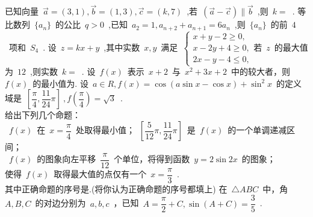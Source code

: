 \documentclass[printbox]{BHCexam}
\begin{document}
\begin{questions}
\clearpage
\begin{figure*}[!htb] 
\begin{minipage}[t]{0.5\textwidth}%
\vspace{-1cm}
\centering  
\end{minipage}  
\begin{minipage}[t]{0.5\textwidth}  
\vspace{0cm}
\centering  
\end{minipage}  
\end{figure*}
\vspace{-2cm}
\tiankong
\question 已知向量~$\vec{a}=(3,1),\vec{b}=(1,3),\vec{c}=(k,7)$~,若~$(\vec{a}-\vec{c}) \parallel \vec{b}$~,则~$k=$~\mtk{}.
\question 等比数列~$\{a_n \}$~的公比~$q>0$~,已知~$a_2=1,a_{n+2}+a_{n+1}=6a_n$~,则~$\{a_n \}$~的前~$4$~项和~$S_4$~\mtk{}.
\question 设~$z=kx+y$~,其中实数~$x,y$~满足~$ \begin{cases}
x+y-2\geq 0,\\
x-2y+4\geq 0, \\
2x-y-4\leq 0,
\end{cases}$若~$z$~的最大值为~$12$~,则实数~$k=$~\mtk{}.
\question 设~$f(x)$~表示~$x+2$~与~$x^2+3x+2$~中的较大者，则~$f(x)$~的最小值为\mtk{}.
\question 设~$a\in R,f(x)=\cos (a\sin x-\cos x)+\sin ^2 x$~的定义域是~$\left[ \dfrac{\pi}{4},\dfrac{11}{24} \pi \right]~,f(\dfrac{\pi}{4})=\sqrt{3}$~.\\给出下列几个命题：\\
~$f(x)$~在~$x=\dfrac{\pi}{4}$~处取得最小值；~$\left[ \dfrac{5}{12} \pi,\dfrac{11}{24} \pi \right]$~是~$f(x)$~的一个单调递减区间；\\
~$f(x)$~的图象向左平移~$\dfrac{\pi}{12}$~个单位，将得到函数~$y=2\sin {2x}$~的图象；\\
使得~$f(x)$~取得最大值的点仅有一个~$x=\dfrac{\pi}{3}$~.\\
其中正确命题的序号是\mtk{}.(将你认为正确命题的序号都填上)
\jianda
\question 在~$\triangle ABC$~中，角~$A,B,C$~的对边分别为~$a,b,c$~，已知~$A=\dfrac{\pi}{2}+C,\sin (A+C)=\dfrac{3}{5}$~.
\end{questions}
\end{document}
